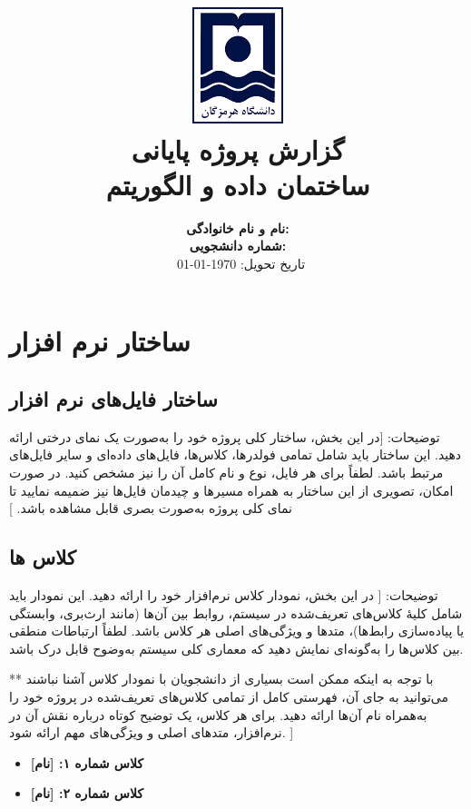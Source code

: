 \documentclass[12pt]{article}
\title{
	\vspace*{-2cm}
	\includegraphics[width=0.2\textwidth]{university-logo}\\
	\vspace{1cm}
	\textcolor{primary}{\bfseries  گزارش پروژه پایانی}\\
	\Huge ساختمان داده و الگوریتم
}
\author{
	\large
	\textbf{نام و نام خانوادگی:} \hrulefill \\
	\vspace{0.5cm}
	\textbf{شماره دانشجویی:} \hrulefill \\
	\vspace{1cm}
	\textcolor{primary}{\faCalendar\ تاریخ تحویل: \today}
}
\date{}
\begin{document}
	
	\maketitle
	\thispagestyle{empty}
	
	\newpage
	\renewcommand{\contentsname}{\textcolor{primary}{فهرست مطالب}}
	\tableofcontents
	\newpage
	
	
	\section{ساختار نرم افزار}
	\subsection{ساختار فایل‌های نرم افزار}
	توضیحات: [در این بخش، ساختار کلی پروژه خود را به‌صورت یک نمای درختی  ارائه دهید. این ساختار باید شامل تمامی فولدرها، کلاس‌ها، فایل‌های داده‌ای و سایر فایل‌های مرتبط باشد. لطفاً برای هر فایل، نوع  و نام کامل آن را نیز مشخص کنید. در صورت امکان، تصویری از این ساختار به همراه مسیرها  و چیدمان فایل‌ها نیز ضمیمه نمایید تا نمای کلی پروژه به‌صورت بصری قابل مشاهده باشد.  ]
	\subsection{کلاس ها}
	توضیحات: [ 
در این بخش، نمودار کلاس  نرم‌افزار خود را ارائه دهید. این نمودار باید شامل کلیهٔ کلاس‌های تعریف‌شده در سیستم، روابط بین آن‌ها (مانند ارث‌بری، وابستگی یا پیاده‌سازی رابط‌ها)، متدها و ویژگی‌های اصلی هر کلاس باشد. لطفاً ارتباطات منطقی بین کلاس‌ها را به‌گونه‌ای نمایش دهید که معماری کلی سیستم به‌وضوح قابل درک باشد.

** با توجه به اینکه ممکن است بسیاری از دانشجویان با نمودار کلاس آشنا نباشند می‌توانید به جای آن، فهرستی کامل از تمامی کلاس‌های تعریف‌شده در پروژه خود را به‌همراه نام آن‌ها ارائه دهید. برای هر کلاس، یک توضیح کوتاه درباره نقش آن در نرم‌افزار، متدهای اصلی و ویژگی‌های مهم ارائه شود. ]
	\begin{itemize}[noitemsep]
		\item \textbf{کلاس شماره ۱: [نام]}\\
		\lipsum[8]
		\item \textbf{کلاس شماره ۲: [نام]}\\
		\lipsum[8]
		
	\end{itemize}
	\newpage
\end{document}
